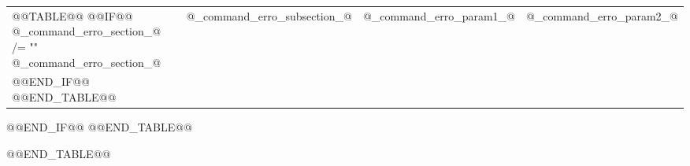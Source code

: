 \documentclass{article}
\begin{document}
			\begin{center}
				\begin{xtabular}{l | l | p{.3\textwidth} | p{.3\textwidth}}
					@@TABLE@@
						@@IF@@ @_command_erro_section_@ /= ""
							@_command_erro_section_@	& 
							@_command_erro_subsection_@	& 
							@_command_erro_param1_@	& 
							@_command_erro_param2_@ \\
						@@END_IF@@
					@@END_TABLE@@
				\end{xtabular}
			\end{center}
	

	@@END_IF@@
	@@END_TABLE@@



@@END_TABLE@@




\noindent\dotfill
\end{document}
